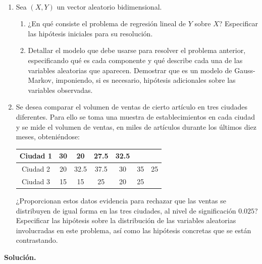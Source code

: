 \documentclass[12pt]{article}
\begin{document}
    \begin{ejercicio}
        \ \\
        \begin{enumerate}[label=\alph*)]
            \item Sea $(X,Y)$ un vector aleatorio bidimensional.
                \begin{enumerate}[label=\alph*)]
                    \item ¿En qué consiste el problema de regresión lineal de $Y$ sobre $X$? Especificar las hipótesis iniciales para su resolución.
                    \item Detallar el modelo que debe usarse para resolver el problema anterior, especificando qué es cada componente y qué describe cada una de las variables aleatorias que aparecen. Demostrar que es un modelo de Gauss-Markov, imponiendo, si es necesario, hipótesis adicionales sobre las variables observadas.
                \end{enumerate}
            \item Se desea comparar el volumen de ventas de cierto artículo en tres ciudades diferentes. Para ello se toma una muestra de establecimientos en cada ciudad y se mide el volumen de ventas, en miles de artículos durante los últimos diez meses, obteniéndose:
                \begin{table}[H]
                \centering
                \begin{tabular}{c|cccccc}
                    Ciudad 1 & 30 & 20 & 27.5 & 32.5 & &\\
                    \hline
                    Ciudad 2 & 20 & 32.5 & 37.5 & 30 & 35 & 25 \\
                    \hline
                    Ciudad 3 & 15 & 15 & 25 & 20 & 25 & 
                \end{tabular}
                \end{table}
                ¿Proporcionan estos datos evidencia para rechazar que las ventas se distribuyen de igual forma en las tres ciudades, al nivel de significación $0.025$? Especificar las hipótesis sobre la distribución de las variables aleatorias involucradas en este problema, así como las hipótesis concretas que se están contrastando.
        \end{enumerate}
    \end{ejercicio}

    \newpage

    \newpage
    \setcounter{ejercicio}{0} %
    \noindent
    \textbf{Solución.}
\end{document}
